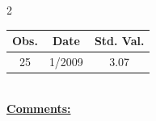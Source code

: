 
\bigskip 
\begin{multicols}{2}{ 
\begin{tabular}{ccc}
\hline  Obs.  &  Date &  Std. Val. \\ 
\hline 
                       25 &        1/2009 &          3.07 \vspace{-.12in} \\  
 \end{tabular} 
\\ 
 \columnbreak 
 \singlespacing 
 \underline{\textbf{Comments:}} \\ 
 \bigskip       

 } 
\end{multicols} 
